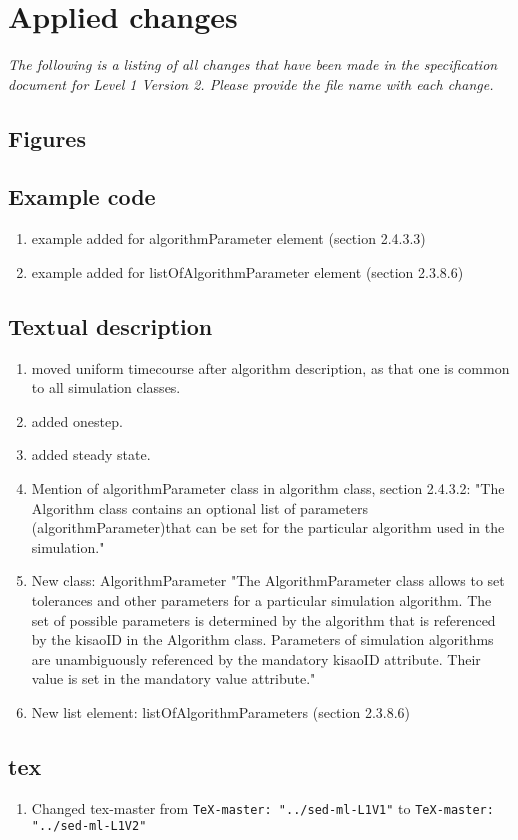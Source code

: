 \documentclass{article}
\newcommand{\code}[1]{\texttt{#1}}
\begin{document}
\section{Applied changes}
\emph{The following is a listing of all changes that have been made in the specification document for Level 1 Version 2. Please provide the file name with each change.}

\subsection{Figures}

\subsection{Example code}
\begin{enumerate}
\item example added for algorithmParameter element (section 2.4.3.3)
\item example added for listOfAlgorithmParameter element (section 2.3.8.6)
\end{enumerate}

\subsection{Textual description}

\begin{enumerate}
\item moved uniform timecourse after algorithm description, as that one is common to all simulation classes. 
\item added onestep. 
\item added steady state. 


\item Mention of algorithmParameter class in algorithm class, section 2.4.3.2: "The Algorithm class contains an optional list of parameters (algorithmParameter)that can be set for the particular algorithm used in the simulation."
\item New class: AlgorithmParameter "The AlgorithmParameter class allows to set tolerances and other parameters for a particular simulation
algorithm. The set of possible parameters is determined by the algorithm that is referenced by the
kisaoID in the Algorithm class. Parameters of simulation algorithms are unambiguously referenced by
the mandatory kisaoID attribute. Their value is set in the mandatory value attribute."
\item New list element: listOfAlgorithmParameters (section 2.3.8.6)
\end{enumerate}

\subsection{tex}

\begin{enumerate}
\item Changed tex-master from  \code{TeX-master: "../sed-ml-L1V1"} to  \code{TeX-master: "../sed-ml-L1V2"}
\end{enumerate}
\end{document}
